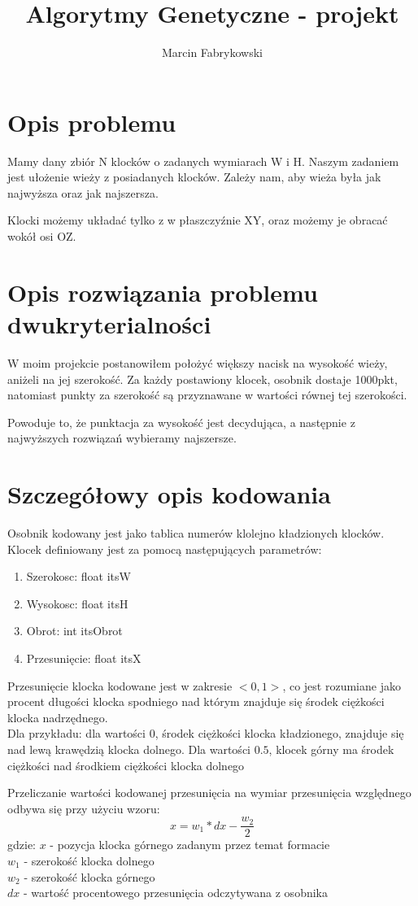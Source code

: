\documentclass[12pt,a4paper]{article}
\title{Algorytmy Genetyczne - projekt}
\author{Marcin Fabrykowski}
\begin{document}
\maketitle
\newpage
\tableofcontents
\newpage
\section{Opis problemu}
Mamy dany zbiór N klocków o zadanych wymiarach W i H. Naszym zadaniem jest ułożenie wieży z posiadanych klocków. Zależy nam, aby wieża była jak najwyższa oraz jak najszersza.

Klocki możemy układać tylko z w płaszczyźnie XY, oraz możemy je obracać wokół osi OZ.
\section{Opis rozwiązania problemu dwukryterialności}
W moim projekcie postanowiłem położyć większy nacisk na wysokość wieży, aniżeli na jej szerokość.
Za każdy postawiony klocek, osobnik dostaje 1000pkt, natomiast punkty za szerokość są przyznawane w wartości równej tej szerokości.

Powoduje to, że punktacja za wysokość jest decydująca, a następnie z najwyższych rozwiązań wybieramy najszersze.
\section{Szczegółowy opis kodowania}
Osobnik kodowany jest jako tablica numerów klolejno kładzionych klocków.\\
Klocek definiowany jest za pomocą następujących parametrów:
\begin{enumerate}
\item Szerokosc: float itsW
\item Wysokosc: float itsH
\item Obrot: int itsObrot
\item Przesunięcie: float itsX
\end{enumerate}
Przesunięcie klocka kodowane jest w zakresie $<0,1>$, co jest rozumiane jako procent długości klocka spodniego nad którym znajduje się środek ciężkości klocka nadrzędnego.\\
Dla przykładu: dla wartości $0$, środek ciężkości klocka kładzionego, znajduje się nad lewą krawędzią klocka dolnego. Dla wartości $0.5$, klocek górny ma środek ciężkości nad środkiem ciężkości klocka dolnego

Przeliczanie wartości kodowanej przesunięcia na wymiar przesunięcia względnego odbywa się przy użyciu wzoru:
$$x=w_1*dx-\frac{w_2}{2}$$
gdzie: $x$ - pozycja klocka górnego zadanym przez temat formacie\\
$w_1$ - szerokość klocka dolnego\\
$w_2$ - szerokość klocka górnego\\
$dx$ - wartość procentowego przesunięcia odczytywana z osobnika
\end{document}

